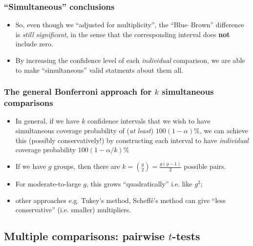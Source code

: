 \documentclass[a4paper]{article}
\begin{document}
\subsubsection{``Simultaneous'' conclusions}
\begin{itemize}
	\item So, even though we ``adjusted for multiplicity'', the ``Blue--Brown'' difference is \textit{still significant}, in the sense that the corresponding interval does \textbf{not} include zero.
	\item By increasing the confidence level of each \textit{individual} comparison, we are able to make ``simultaneous'' valid statments about them all.
\end{itemize}
\subsubsection{The general Bonferroni approach for \( k \) simultaneous comparisons}
\begin{itemize}
	\item In general, if we have \( k \)  confidence intervals that we wish to have simultaneous coverage probability of (\textit{at least}) \( 100(1-\alpha)\% \), we can achieve this (possibly conservatively!) by constructing each interval to have \textit{individual} coverage probability \( 100(1-\alpha/k)\% \)
	\item If we have \( g \) groups, then there are \( k = \binom{g}{2} = \frac{g(g-1)}{2} \) possible pairs.
	\item For moderate-to-large \( g \), this grows ``quadratically'' i.e. like \( g^2 \);
	\item other approaches e.g. Tukey's method, Scheffé's method can give ``less conservative'' (i.e. smaller) multipliers.
\end{itemize}
\subsection{Multiple comparisons: pairwise \( t \)-tests}
\end{document}
